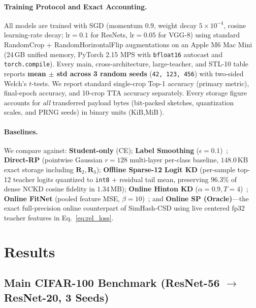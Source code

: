 \documentclass{article}
\begin{document}
\paragraph{Training Protocol and Exact Accounting.}
All models are trained with SGD (momentum $0.9$, weight decay $5\times 10^{-4}$, cosine learning-rate decay; $\text{lr}=0.1$ for ResNets, $\text{lr}=0.05$ for VGG-8) using standard RandomCrop + RandomHorizontalFlip augmentations on an Apple M6 Mac Mini (24\,GB unified memory, PyTorch 2.15 MPS with \texttt{bfloat16} autocast and \texttt{torch.compile}). Every main, cross-architecture, large-teacher, and STL-10 table reports \textbf{mean $\pm$ std across 3 random seeds} (\texttt{42, 123, 456}) with two-sided Welch's $t$-tests. We report standard single-crop Top-1 accuracy (primary metric), final-epoch accuracy, and 10-crop TTA accuracy separately. Every storage figure accounts for \emph{all} transferred payload bytes (bit-packed sketches, quantization scales, and PRNG seeds) in binary units ($\text{KiB}, \text{MiB}$).

\paragraph{Baselines.}
We compare against: \textbf{Student-only} (CE); \textbf{Label Smoothing} ($\epsilon=0.1$)~\citep{szegedy2016rethinking}; \textbf{Direct-RP} (pointwise Gaussian $r=128$ multi-layer per-class baseline, $148.0$\,KB exact storage including $\mathbf{R}_2, \mathbf{R}_3$); \textbf{Offline Sparse-12 Logit KD} (per-sample top-12 teacher logits quantized to \texttt{int8} + residual tail mean, preserving $96.3\%$ of dense NCKD cosine fidelity in $1.34$\,MB); \textbf{Online Hinton KD} ($\alpha=0.9, T=4$)~\citep{hinton2015distilling}; \textbf{Online FitNet} (pooled feature MSE, $\beta=10$)~\citep{romero2015fitnets}; and \textbf{Online SP (Oracle)}---the exact full-precision online counterpart of SimHash-CSD using live centered fp32 teacher features in Eq.~\eqref{eq:rel_loss}.

\section{Results}
\label{sec:results}

\subsection{Main CIFAR-100 Benchmark (ResNet-56 $\to$ ResNet-20, 3 Seeds)}
\end{document}
